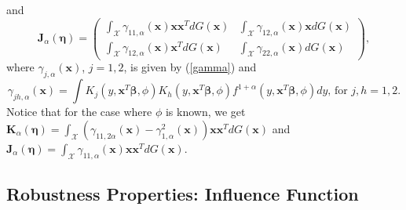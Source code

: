 \documentclass[a4paper]{article}%
\begin{document}
and
\[
\boldsymbol{J}_{\alpha}(\boldsymbol{\eta})=%
\begin{pmatrix}
{\int_{\mathcal{X}}}\gamma_{11,\alpha}(\boldsymbol{x})\boldsymbol{x}%
\boldsymbol{x}^{T}dG(\boldsymbol{x}) & {\int_{\mathcal{X}}}\gamma_{12,\alpha
}(\boldsymbol{x})\boldsymbol{x}dG(\boldsymbol{x})\\
{\int_{\mathcal{X}}}\gamma_{12,\alpha}(\boldsymbol{x})\boldsymbol{x}^T%
dG(\boldsymbol{x}) & {\int_{\mathcal{X}}}\gamma_{22,\alpha}(\boldsymbol{x}%
)dG(\boldsymbol{x})
\end{pmatrix}
,
\]
where $\gamma_{j,\alpha}(\boldsymbol{x})$, $j=1,2$, is given by (\ref{gamma})
and
\[
\gamma_{jh,\alpha}(\boldsymbol{x})=\int K_{j}\left(  y,\boldsymbol{x}%
^{T}\boldsymbol{\beta},\phi\right)  K_{h}\left(  y,\boldsymbol{x}%
^{T}\boldsymbol{\beta},\phi\right)  f^{1+\alpha}\left(  y,\boldsymbol{x}%
^{T}\boldsymbol{\beta},\phi\right)  dy\text{, for }j,h=1,2.
\]
Notice that for the case where $\phi$ is known, we get $\boldsymbol{K}_{\alpha
}(\boldsymbol{\eta})={\int_{\mathcal{X}}}\left(  \gamma_{11,2\alpha
}(\boldsymbol{x})-\gamma_{1,\alpha}^{2}(\boldsymbol{x})\right)  \boldsymbol{x}%
\boldsymbol{x}^{T}dG(\boldsymbol{x})$ and $\boldsymbol{J}_{\alpha
}(\boldsymbol{\eta})={\int_{\mathcal{X}}}\gamma_{11,\alpha}(\boldsymbol{x}%
)\boldsymbol{x}\boldsymbol{x}^{T}dG(\boldsymbol{x})$.

\subsection{Robustness Properties: Influence Function}

\label{sec2.2}
\end{document}

